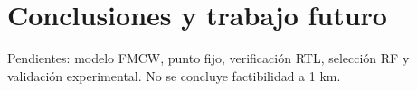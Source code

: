 \section{Conclusiones y trabajo futuro} Pendientes: modelo FMCW, punto fijo, verificación RTL, selección RF y validación experimental. No se concluye factibilidad a 1 km.
